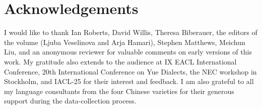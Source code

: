 \documentclass[output=paper,colorlinks,citecolor=brown,chinesefont]{langscibook}
\begin{document}
\section*{Acknowledgements}

I would like to thank Ian Roberts, David Willis, Theresa Biberauer, the editors of the volume (Ljuba Veselinova and Arja Hamari), Stephen Matthews, Meichun Liu, and an anonymous reviewer for valuable comments on early versions of this work. My gratitude also extends to the audience at IX EACL International Conference, 20th International Conference on Yue Dialects, the NEC workshop in Stockholm, and IACL-25 for their interest and feedback. I am also grateful to all my language consultants from the four Chinese varieties for their generous support during the data-collection process. 


\end{document}
